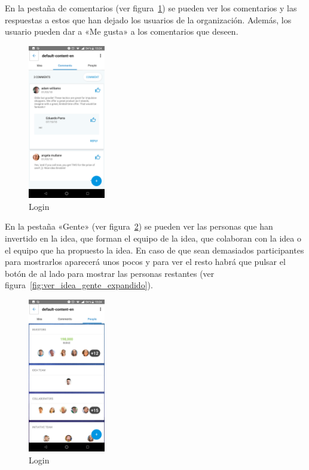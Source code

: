 En la pestaña de comentarios (ver figura~\ref{fig:ver_idea_comentarios}) se pueden ver los comentarios 
y las respuestas a estos que han dejado los usuarios de la organización. Además, los usuario pueden 
dar a «Me gusta» a los comentarios que deseen.

\begin{figure}[!h]
	\begin{center}
		\includegraphics[width=0.3\textwidth]{./img/anexo1/ver_idea_comentarios.png}
		\caption{Login}
		\label{fig:ver_idea_comentarios}
	\end{center}
\end{figure}

En la pestaña «Gente» (ver figura~\ref{fig:ver_idea_gente}) se pueden ver las personas 
que han invertido en la idea, que forman el equipo de la idea, que colaboran con la idea o 
el equipo que ha propuesto la idea. En caso de que sean demasiados participantes para 
mostrarlos aparecerá unos pocos y para ver el resto habrá que pulsar el botón de al lado 
para mostrar las personas restantes (ver figura~\ref{fig:ver_idea_gente_expandido}).

\begin{figure}[!h]
	\begin{center}
		\includegraphics[width=0.3\textwidth]{./img/anexo1/ver_idea_gente.png}
		\caption{Login}
		\label{fig:ver_idea_gente}
	\end{center}
\end{figure}

